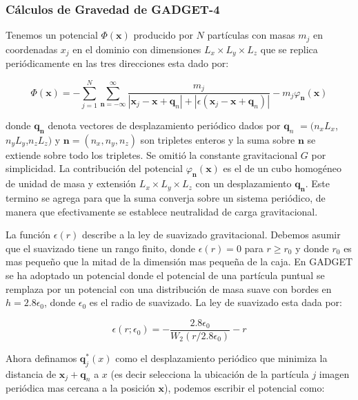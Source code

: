 \subsubsection{Cálculos de Gravedad de GADGET-4}

Tenemos un potencial $\Phi (\mathbf{x})$ producido por $N$ partículas con masas $m_j$ en coordenadas $x_j$ en el dominio con dimensiones $L_x \times L_y \times L_z$ que se replica periódicamente en las tres direcciones esta dado por:

\begin{equation}
    \Phi (\mathbf{x}) = - \sum_{j=1}^{N} \sum_{\mathbf{n}=-\infty}^{\infty}  \frac{ m_j }{ |\mathbf{x}_j - \mathbf{x} + \mathbf{q}_n| + |\epsilon ( \mathbf{x}_j - \mathbf{x} + \mathbf{q}_n)| }   - m_j\varphi_{\mathbf{n}}(\mathbf{x})
    \label{eq:Grav_Pot_1}
\end{equation}

\noindent donde $\mathbf{q_n}$ denota vectores de desplazamiento periódico dados por $\mathbf{q}_n$ $=(n_x L_x $,$ n_y L_y $,$n_z L_z)$ y $\mathbf{n} = (n_x, n_y, n_z)$ son tripletes enteros y la suma sobre $\mathbf{n}$ se extiende sobre todo los tripletes. Se omitió la constante gravitacional $G$ por simplicidad. La contribución del potencial $\varphi_{\mathbf{n}}(\mathbf{x})$ es el de un cubo homogéneo de unidad de masa y extensión $L_x \times L_y \times L_z$ con un desplazamiento $\mathbf{q_n}$. Este termino se agrega para que la suma converja sobre un sistema periódico, de manera que efectivamente se establece neutralidad de carga gravitacional.

La función $\epsilon(r)$ describe a la ley de suavizado gravitacional. Debemos asumir que el suavizado tiene un rango finito, donde $\epsilon(r)=0$ para $r\geq r_0$ y donde $r_0$ es mas pequeño que la mitad de la dimensión mas pequeña de la caja. En GADGET se ha adoptado un potencial donde el potencial de una partícula puntual se remplaza por un potencial con una distribución de masa suave con bordes en $h=2.8\epsilon_0$, donde $\epsilon_0$ es el radio de suavizado. La ley de suavizado esta dada por:

\begin{equation}
    \epsilon(r;\epsilon_0) = - \frac{2.8\epsilon_0}{W_2(r/2.8\epsilon_0)} -r
    \label{eq:Ley-Suavizado}
\end{equation}

Ahora definamos $\mathbf{q}^*_j(x)$ como el desplazamiento periódico que minimiza la distancia de $\mathbf{x}_j+\mathbf{q}_n$ a $x$ (es decir selecciona la ubicación de la partícula $j$ imagen periódica mas cercana a la posición $\mathbf{x}$), podemos escribir el potencial como:

